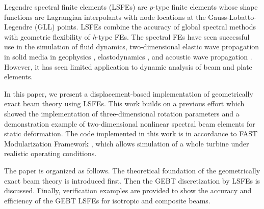 Legendre spectral finite elements\cite{Patera:1984,Ronquist:1987} (LSFEs) are
$p$-type finite elements whose shape functions are Lagrangian interpolants
with node locations at the Gauss-Lobatto-Legendre (GLL) points. LSFEs combine
the accuracy of global spectral methods with geometric flexibility of {\it
h}-type FEs. The spectral FEs have seen successful use in
the simulation of fluid dynamics\cite{Ronquist:1987, Patera:1984,
Deville:2002}, two-dimensional elastic wave propagation in solid media in
geophysics \cite{Komatitsch:1998}, elastodynamics \cite{Sridhar:2006}, and
acoustic wave propagation \cite{Sprague:2004}. However, it has seen limited
application to dynamic analysis of
beam\cite{Ben-Tal-etal:1995,Ben-Tal-etal:1996,Kudela-etal:2007a,Sprague-Geers:2008}
and plate elements\cite{Zrahia-Bar-Yoseph:1995,
Kudela-etal:2007b,Sprague-Brito:2012}.   

In this paper, we present a displacement-based implementation of
geometrically exact beam theory using LSFEs.  This work builds on a previous
effort which showed the implementation of three-dimensional rotation
parameters\cite{Wang:GEBT2013} and a demonstration example of
two-dimensional nonlinear spectral beam elements\cite{Wang:SFE2013} for
static deformation.  The code implemented in this work is in accordance to
FAST Modularization Framework \cite{Jonkman:2013},  which allows simulation
of a whole turbine under realistic operating conditions.

The paper is organized as follows.  The theoretical foundation of the
geometrically exact beam theory is introduced first. Then the GEBT
discretization by LSFEs is discussed. Finally, verification examples are
provided to show the accuracy and efficiency of the GEBT LSFEs  for
isotropic  and composite beams.  

